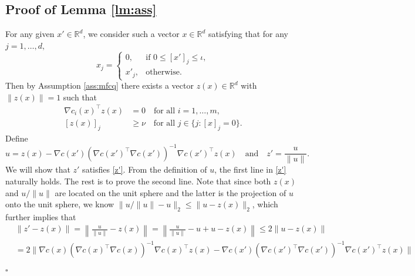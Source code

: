 \documentclass[11pt]{article}
\newenvironment{proof}{{\noindent\it Proof.}\quad}{\hfill $\square$\par}
\newcommand{\R}{\mathbb{R}}
\newcommand{\be}{\begin{equation}}
\newcommand{\ee}{\end{equation}}
\begin{document}
\subsection{Proof of Lemma \ref{lm:ass}}\label{proof:lm-ass}
\begin{proof}
    For any given $x'\in\R^d$, we consider such a  vector   \(x\in \R^d\) satisfying that for any $j=1,\ldots,d,$
    \[
    x_j =
    \begin{cases}
    0, & \text{if } 0 \le [x']_j \le \iota,\\[4pt]
    x'_j, & \text{otherwise}.
    \end{cases}
    \]
    Then by Assumption \ref{ass:mfcq} there exists  a vector \(z(x) \in \R^d\) with \(\|z(x)\|=1\) such that
    \be\begin{aligned}\label{mfcq1}
    \nabla c_i(x)^\top z(x) & = 0 \quad \text{for all } i = 1, \ldots, m,\\
    [z(x)]_j & \ge \nu \quad \text{for all } j \in \{ j : [x]_j = 0 \}.
    \end{aligned}\ee
    Define \[u = z(x) - \nabla c(x') (\nabla c(x')^{\top} \nabla c(x'))^{-1} \nabla c(x')^{\top}z(x)\quad\mbox{and}\quad z'=\frac{u}{\|u\|}.\] We will show that \(z' \) satisfies \eqref{z'}. From the definition of \(u\), the first line in \eqref{z'} naturally holds. The rest is to prove the second line. Note that since both $z(x)$ and $u/\|u\|$ are located on the unit sphere and the latter is the projection of $u$ onto the unit sphere,  we know $\|{u}/{\|u\|}-u\|_2\le \|u-z(x)\|_2$, which further implies that 
    \begin{align*}
        & \|z' - z(x)\| = \left\|\frac{u}{\|u\|} - z(x)\right\| = \left\|\frac{u}{\|u\|} - u + u - z(x)\right\| \leq 2\|u-z(x)\|\\
        &= 2\|\nabla c(x) (\nabla c(x)^{\top} \nabla c(x))^{-1} \nabla c(x)^{\top}z(x) - \nabla c(x') (\nabla c(x')^{\top} \nabla c(x'))^{-1} \nabla c(x')^{\top}z(x)\|\\

\end{align*}
\end{proof}
\end{document}
